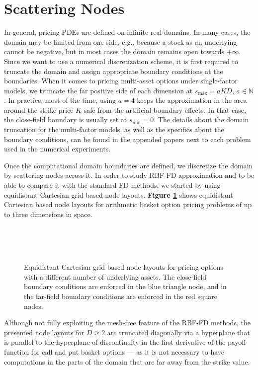 \documentclass{UUThesisTemplate}
\begin{document}
\section{Scattering Nodes}
In general, pricing PDEs are defined on infinite real domains. In many cases, the domain may be limited from one side, e.g., because a stock as an underlying cannot be negative, but in most cases the domain remains open towards $+\infty$. Since we want to use a numerical discretization scheme, it is first required to truncate the domain and assign appropriate boundary conditions at the boundaries. When it comes to pricing multi-asset options under single-factor models, we truncate the far positive side of each dimension at $s_{\max}=aKD$, $a\in\mathbb{N}$. In practice, most of the time, using $a=4$ keeps the approximation in the area around the strike price $K$ safe from the artificial boundary effects. In that case, the close-field boundary is usually set at $s_{\min}=0$. The details about the domain truncation for the multi-factor models, as well as the specifics about the boundary conditions, can be found in the appended papers next to each problem used in the numerical experiments.
\par Once the computational domain boundaries are defined, we discretize the domain by scattering nodes across it. In order to study RBF-FD approximation and to be able to compare it with the standard FD methods, we started by using equidistant Cartesian grid based node layouts. \textbf{Figure \ref{fig:gridreg}} shows equidistant Cartesian based node layouts for arithmetic basket option pricing problems of up to three dimensions in space.  
\begin{figure}[H]
\centering
\\
\vspace{11pt}
\\
\vspace{11pt}
\\
\caption{Equidistant Cartesian grid based node layouts for pricing options with a different number of underlying assets. The close-field boundary conditions are enforced in the blue triangle node, and in the far-field boundary conditions are enforced in the red square nodes.}
\label{fig:gridreg}
\end{figure}
Although not fully exploiting the mesh-free feature of the RBF-FD methods, the presented node layouts for $D\geq2$ are truncated diagonally via a hyperplane that is parallel to the hyperplane of discontinuity in the first derivative of the payoff function for call and put basket options --- as it is not necessary to have computations in the parts of the domain that are far away from the strike value.  
\end{document}
